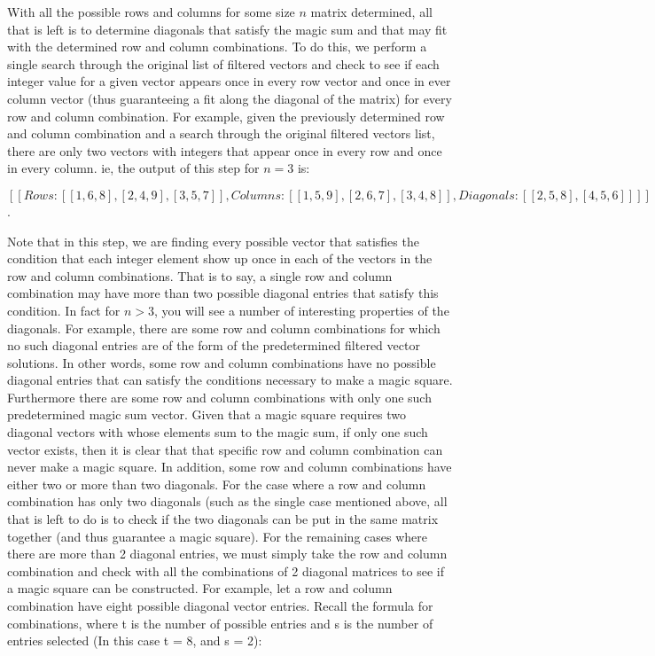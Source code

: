 \documentclass{article}
\begin{document}
    With all the possible rows and columns for some size $n$ matrix determined, all that is left is to determine diagonals that satisfy the magic sum and that may fit with the determined row and column combinations. To do this, we perform a single search through the original list of filtered vectors and check to see if each integer value for a given vector appears once in every row vector and once in ever column vector (thus guaranteeing a fit along the diagonal of the matrix) for every row and column combination. For example, given the previously determined row and column combination and a search through the original filtered vectors list, there are only two vectors with integers that appear once in every row and once in every column. ie, the output of this step for $n = 3$ is:
    \begin{center}
        $[[Rows: [[1, 6, 8], [2, 4, 9], [3, 5, 7]], Columns: [[1, 5, 9], [2, 6, 7], [3, 4, 8]], Diagonals: [[2, 5, 8], [4, 5, 6]]]]$. 
    \end{center}
    Note that in this step, we are finding every possible vector that satisfies the condition that each integer element show up once in each of the vectors in the row and column combinations. That is to say, a single row and column combination may have more than two possible diagonal entries that satisfy this condition. In fact for $n > 3$, you will see a number of interesting properties of the diagonals. For example, there are some row and column combinations for which no such diagonal entries are of the form of the predetermined filtered vector solutions. In other words, some row and column combinations have no possible diagonal entries that can satisfy the conditions necessary to make a magic square. Furthermore there are some row and column combinations with only one such predetermined magic sum vector. Given that a magic square requires two diagonal vectors with whose elements sum to the magic sum, if only one such vector exists, then it is clear that that specific row and column combination can never make a magic square. In addition, some row and column combinations have either two or more than two diagonals. For the case where a row and column combination has only two diagonals (such as the single case mentioned above, all that is left to do is to check if the two diagonals can be put in the same matrix together (and thus guarantee a magic square). For the remaining cases where there are more than 2 diagonal entries, we must simply take the row and column combination and check with all the combinations of 2 diagonal matrices to see if a magic square can be constructed. For example, let a row and column combination have eight possible diagonal vector entries. Recall the formula for combinations, where t is the number of possible entries and s is the number of entries selected (In this case t = 8, and s = 2):
\end{document}
